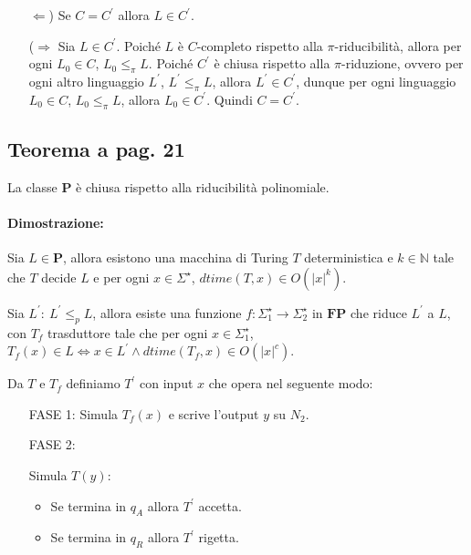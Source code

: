 \begin{itemize}
    \item [$\Leftarrow$)] Se $C = C^{'}$ allora $L \in C^{'}$.
    \item [($\Rightarrow$]{
        Sia $L \in C^{'}$. Poiché $L$ è $C$-completo rispetto alla $\pi$-riducibilità, allora per ogni $L_{0} \in C$, 
        $L_{0} \leq_{\pi} L$. Poiché $C^{'}$ è chiusa rispetto alla $\pi$-riduzione, ovvero per ogni altro linguaggio 
        $L^{'}$, $L^{'} \leq_{\pi} L$, allora $L^{'} \in C^{'}$, dunque per ogni linguaggio $L_{0} \in C$, $L_{0} \leq_{\pi} L$,
        allora $L_{0} \in C^{'}$. Quindi $C = C^{'}$.
    }
\end{itemize}

\subsection{Teorema a pag. 21}

La classe \textbf{P} è chiusa rispetto alla riducibilità polinomiale.

\paragraph*{Dimostrazione:}

Sia $L \in \textbf{P}$, allora esistono una macchina di Turing $T$ deterministica e $k \in \mathbb{N}$ tale che $T$ decide $L$ e 
per ogni $x \in \Sigma^{\star}$, $dtime(T, x) \in O(|x|^k)$.

Sia $L^{'}:\ L^{'} \leq_{p} L$, allora esiste una funzione $f: \Sigma^{\star}_{1} \rightarrow \Sigma^{\star}_{2}$ in $\textbf{FP}$
che riduce $L^{'}$ a $L$, con $T_{f}$ trasduttore tale che per ogni $x \in \Sigma^{\star}_{1}$, $T_{f}(x) \in L \Leftrightarrow x \in L^{'}
\land dtime(T_{f}, x) \in O(|x|^c)$.

Da $T$ e $T_{f}$ definiamo $T^{'}$ con input $x$ che opera nel seguente modo:

\begin{itemize}
    \item [FASE 1:] Simula $T_{f}(x)$ e scrive l'output $y$ su $N_{2}$.
    \item [FASE 2:] {
        Simula $T(y)$:
        \begin{itemize}
            \item Se termina in $q_{A}$ allora $T^{'}$ accetta.
            \item Se termina in $q_{R}$ allora $T^{'}$ rigetta.
        \end{itemize}
    }
\end{itemize}

